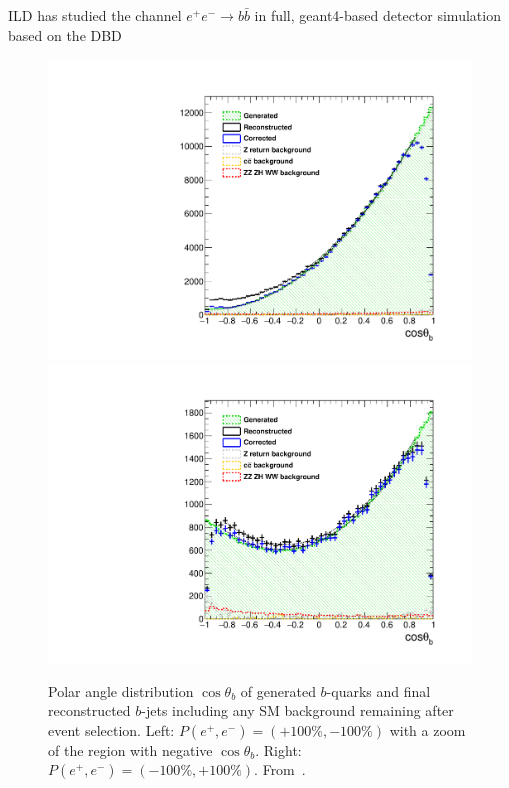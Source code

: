 ILD has studied the channel $e^+e^- \to b\bar{b}$ in full, geant4-based detector simulation based on the DBD

\begin{figure}[hbt]
       \includegraphics[width=0.4\linewidth]{./chapters/figures/basymmetry-final-left.pdf}
        \hspace{0.2cm}       
        \includegraphics[width=0.4\linewidth]{./chapters/figures/basymmetry-final-right.pdf}
	\caption{Polar angle distribution $\cos{\theta_b}$ of generated $b$-quarks and final reconstructed 
         $b$-jets including any SM  background remaining after event selection. 
         Left:  $P(e^+,e^-)=(+100\%,-100\%)$ with a zoom of the region with negative 
         $\cos{\theta_b}$.
         Right: $P(e^+,e^-)=(-100\%,+100\%)$. From~\cite{Bilokin:2017lco}.  }
	\label{fig:ffbar_basym}
\end{figure}


